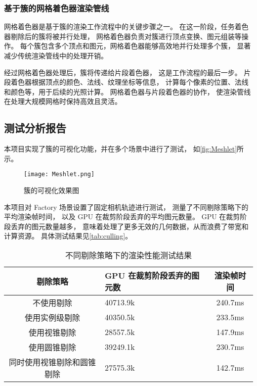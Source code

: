 \subsubsection{基于簇的网格着色器渲染管线}

网格着色器是基于簇的渲染工作流程中的关键步骤之一。
在这一阶段，任务着色器剔除后的簇将被并行处理，
网格着色器负责对簇进行顶点变换、图元组装等操作。
每个簇包含多个顶点和图元，网格着色器能够高效地并行处理多个簇，
显著减少传统渲染管线中的处理开销。

经过网格着色器处理后，簇将传递给片段着色器，
这是工作流程的最后一步。
片段着色器根据顶点的颜色、法线、纹理坐标等信息，
计算每个像素的位置、法线和颜色等，用于后续的光照计算。
网格着色器与片段着色器的协作，
使渲染管线在处理大规模网格时保持高效且灵活。

\subsection{测试分析报告}

本项目实现了簇的可视化功能，并在多个场景中进行了测试，
如\autoref{fig:Meshlet}所示。

\begin{figure}[ht]
    \centering
    \texttt{[image: Meshlet.png]}
    \caption{\label{fig:Meshlet}簇的可视化效果图}
\end{figure}

本项目对 Factory 场景设置了固定相机轨迹进行测试，
测量了不同剔除策略下的平均渲染帧时间，
以及 GPU 在裁剪阶段丢弃的平均图元数量。
GPU 在裁剪阶段丢弃的图元数量越多，
意味着处理了更多无效的几何数据，从而浪费了带宽和计算资源。
具体测试结果见\autoref{tab:culling}。

\begin{table}[ht]
    \caption{\label{tab:culling}不同剔除策略下的渲染性能测试结果}
    \begin{tabularx}{\linewidth}{|c|X<{\centering}|c|}
        \hline
        剔除策略 & GPU 在裁剪阶段丢弃的图元数 & 渲染帧时间 \\ \hline
        不使用剔除 & 40713.9k & 240.7ms \\ \hline
        使用实例级剔除 & 40350.5k & 233.5ms \\ \hline
        使用视锥剔除 & 28557.5k & 147.9ms \\ \hline
        使用圆锥剔除 & 39249.1k & 230.7ms \\ \hline
        同时使用视锥剔除和圆锥剔除 & 27575.3k & 142.7ms \\ \hline
    \end{tabularx}
\end{table}

